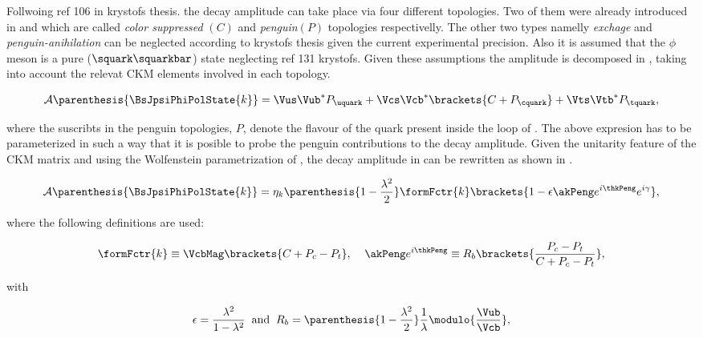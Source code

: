 Follwoing {\color{red} ref 106 in krystofs thesis.} the \BsJpsiPhi decay amplitude can take place via four different topologies.
Two of them were already introduced in  and  which are called {\it color suppressed }$(C)$ and {\it penguin}$(P)$
topologies respectivelly. The other two types namelly {\it exchage} and {\it penguin-anihilation} can be neglected according to {\color{red} krystofs thesis}
given the current experimental precision. Also it is assumed that the $\phi$ meson is a pure ($\squark\squarkbar$) state {\color{red}neglecting ref 131 krystofs}. Given these assumptions the \BsJpsiPhi amplitude
is decomposed in , taking into account the relevat CKM elements involved in each topology.

\begin{equation}
\mathcal{A} \parenthesis{\BsJpsiPhiPolState{k}} = \Vus\Vub^*P_{\uquark} + \Vcs\Vcb^*\brackets{C +P_{\cquark}} + \Vts\Vtb^*P_{\tquark},
 \label{bsjpsiphi_amp}
\end{equation}

\noindent where the suscribts in the penguin topologies, $P$, denote the flavour of the quark present inside the loop of .
The above expresion has to be parameterized in such a way that it is posible to probe the penguin contributions to
the \BsJpsiPhi decay amplitude. Given the unitarity feature of the CKM matrix and using the Wolfenstein parametrization of ,
the decay amplitude in  can be rewritten as shown in .

\begin{equation}
  \mathcal{A} \parenthesis{\BsJpsiPhiPolState{k}} = \eta_k  \parenthesis{1-\frac{\lambda^2}{2}} \formFctr{k} \brackets{ 1 - \epsilon \akPeng e^{i\thkPeng} e^{i\gamma} },
 \label{bsjpsiphi_amp_param}
\end{equation}

\noindent where the following definitions are used:

\begin{equation}
  \formFctr{k} \equiv \VcbMag \brackets{C + P_c - P_t}, \;\;\;\; \akPeng e^{i\thkPeng} \equiv R_b \brackets{ \frac{P_c - P_t}{C + P_c - P_t} },
  \label{bsjpsiphi_amp_param_defs}
\end{equation}

\noindent with

\begin{equation}
  \epsilon = \frac{\lambda^2}{1-\lambda^2} \;\;\text{and} \;\;  R_b = \parenthesis{1-\frac{\lambda^2}{2}} \frac{1}{\lambda} \modulo{\frac{\Vub}{\Vcb}},
  \label{bsjpsiphi_amp_param_defs_II}
\end{equation}

